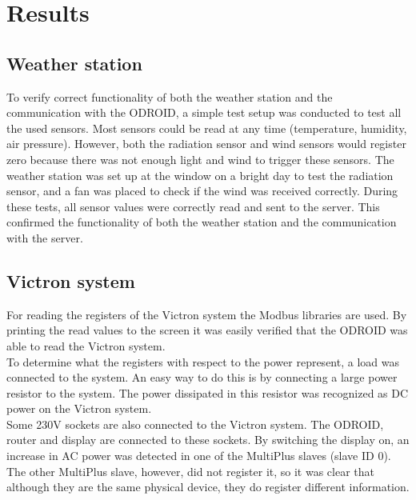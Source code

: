 \section{Results}\label{sec:results}

\subsection{Weather station}
To verify correct functionality of both the weather station and the communication with the ODROID, a simple test setup was conducted to test all the used sensors. Most sensors could be read at any time (temperature, humidity, air pressure). However, both the radiation sensor and wind sensors would register zero because there was not enough light and wind to trigger these sensors. The weather station was set up at the window on a bright day to test the radiation sensor, and a fan was placed to check if the wind was received correctly. During these tests, all sensor values were correctly read and sent to the server. This confirmed the functionality of both the weather station and the communication with the server.

\subsection{Victron system}\label{sec:victron_results}
For reading the registers of the Victron system the Modbus libraries are used. By printing the read values to the screen it was easily verified that the ODROID was able to read the Victron system.\\

To determine what the registers with respect to the power represent, a load was connected to the system. An easy way to do this is by connecting a large power resistor to the system. The power dissipated in this resistor was recognized as DC power on the Victron system. \\

Some 230V sockets are also connected to the Victron system. The ODROID, router and display are connected to these sockets. By switching the display on, an increase in AC power was detected in one of the MultiPlus slaves (slave ID 0). The other MultiPlus slave, however, did not register it, so it was clear that although they are the same physical device, they do register different information.\\

